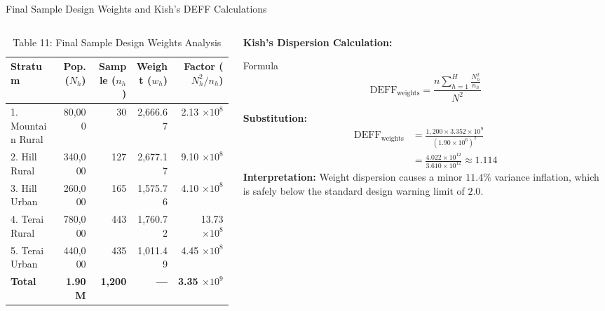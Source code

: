 \documentclass[10pt, aspectratio=169]{beamer}
\begin{document}
  \begin{frame}{Final Sample Design Weights and Kish's DEFF Calculations}
      \begin{columns}
          \begin{column}{0.55\textwidth}
              \begin{table}
                  \caption{Table 11: Final Sample Design Weights Analysis}
                  \tiny
                  \begin{tabularx}{\textwidth}{lrrrr}
                      \toprule
                      \textbf{Stratum} & \textbf{Pop. ($N_h$)} & \textbf{Sample ($n_h$)} & \textbf{Weight ($w_h$)} & \textbf{Factor ($N_h^2/n_h$)} \\
                      \midrule
                      1. Mountain Rural & 80,000 & 30 & 2,666.67 & 2.13 $\times 10^8$ \\
                      2. Hill Rural     & 340,000 & 127 & 2,677.17 & 9.10 $\times 10^8$ \\
                      3. Hill Urban     & 260,000 & 165 & 1,575.76 & 4.10 $\times 10^8$ \\
                      4. Terai Rural    & 780,000 & 443 & 1,760.72 & 13.73 $\times 10^8$ \\
                      5. Terai Urban    & 440,000 & 435 & 1,011.49 & 4.45 $\times 10^8$ \\
                      \midrule
                      \textbf{Total}    & \textbf{1.90M} & \textbf{1,200} & \textbf{---} & \textbf{3.35 $\times 10^9$} \\
                      \bottomrule
                  \end{tabularx}
              \end{table}
          \end{column}
          \begin{column}{0.45\textwidth}
              \textbf{Kish's Dispersion Calculation:}
              \begin{block}{Formula}
                  $$\text{DEFF}_{\text{weights}} = \frac{n \sum_{h=1}^H \frac{N_h^2}{n_h}}{N^2}$$
              \end{block}
              \tiny
              \textbf{Substitution:}
              \begin{align*}
                  \text{DEFF}_{\text{weights}} &= \frac{1,200 \times 3.352 \times 10^9}{(1.90 \times 10^6)^2} \\
                  &= \frac{4.022 \times 10^{12}}{3.610 \times 10^{12}} \approx \mathbf{1.114}
              \end{align*}
              \textbf{Interpretation:}
              Weight dispersion causes a minor $11.4\%$ variance inflation, which is safely below the standard design warning limit of $2.0$.
          \end{column}
      \end{columns}
  \end{frame}
  
\end{document}
